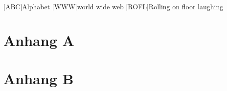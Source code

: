 \documentclass[Master,english,IEEE]{twbook}
\begin{document}
\listaitools
\clearpage

{}
\chapter*{\listacroname}
\begin{acronym}[XXXXX]
    [ABC]{Alphabet}
    [WWW]{world wide web}
    [ROFL]{Rolling on floor laughing}
\end{acronym}

%
%
\clearpage
\appendix
\chapter{Anhang A}
\clearpage
\chapter{Anhang B}
\end{document}
